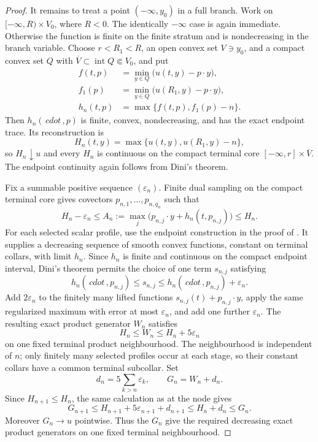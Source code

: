 \begin{proof}
It remains to treat a point $(-\infty,y_0)$ in a full branch.  Work on
$[ -\infty,R)\times V_0$, where $R<0$.  The identically $-\infty$
case is again immediate.  Otherwise the function is finite on the finite
stratum and is nondecreasing in the branch variable.  Choose $r<R_1<R$,
an open convex set $V\ni y_0$, and a compact convex set $Q$ with
$\overline V\subset\operatorname{int}Q\Subset V_0$, and put
\begin{align*}
 f(t,p)&=\min_{y\in Q}\bigl(u(t,y)-p\mathbin\cdot y\bigr),\\
 f_1(p)&=\min_{y\in Q}\bigl(u(R_1,y)-p\mathbin\cdot y\bigr),\\
 h_n(t,p)&=\max\{f(t,p),f_1(p)-n\}.
\end{align*}
Then $h_n(\,cdot\,,p)$ is finite, convex, nondecreasing, and has the
exact endpoint trace.  Its reconstruction is
\begin{equation}
 H_n(t,y)=\max\{u(t,y),u(R_1,y)-n\},
 \label{eq:p071-infinite-euclidean-endpoint-truncation}
\end{equation}
so $H_n\downarrow u$ and every $H_n$ is continuous on the compact
terminal core $[ -\infty,r]\times\overline V$.  The endpoint continuity
again follows from Dini's theorem.

Fix a summable positive sequence $(\varepsilon_n)$.  Finite dual sampling
on the compact terminal core gives covectors
$p_{n,1},\ldots,p_{n,q_n}$ such that
\[
 H_n-\varepsilon_n\leq
 A_n:=\max_j\bigl(p_{n,j}\mathbin\cdot y
                 +h_n(t,p_{n,j})\bigr)\leq H_n.
\]
For each selected scalar profile, use the endpoint construction in the
proof of .  It supplies a
decreasing sequence of smooth convex functions, constant on terminal
collars, with limit $h_n$.  Since $h_n$ is finite and continuous on the
compact endpoint interval, Dini's theorem permits the choice of one term
$s_{n,j}$ satisfying
\[
       h_n(\,cdot\,,p_{n,j})\leq s_{n,j}\leq
       h_n(\,cdot\,,p_{n,j})+\varepsilon_n.
\]
Add $2\varepsilon_n$ to the finitely many lifted functions
$s_{n,j}(t)+p_{n,j}\mathbin\cdot y$, apply the same regularized maximum
with error at most $\varepsilon_n$, and add one further
$\varepsilon_n$.  The resulting exact product generator $W_n$ satisfies
\[
                       H_n\leq W_n\leq H_n+5\varepsilon_n
\]
on one fixed terminal product neighbourhood.  The neighbourhood is
independent of $n$; only finitely many selected profiles occur at each
stage, so their constant collars have a common terminal subcollar.  Set
\[
 d_n=5\sum_{k>n}\varepsilon_k,\qquad G_n=W_n+d_n.
\]
Since $H_{n+1}\leq H_n$, the same calculation as at the node gives
\[
 G_{n+1}\leq H_{n+1}+5\varepsilon_{n+1}+d_{n+1}
 \leq H_n+d_n\leq G_n.
\]
Moreover $G_n\to u$ pointwise.  Thus the $G_n$ give the required
decreasing exact product generators on one fixed terminal neighbourhood.


\end{proof}
